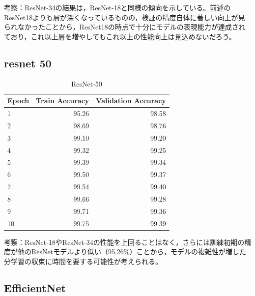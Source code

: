 \documentclass[a4paper,11pt,titlepage]{jsarticle}
\begin{document}
考察：ResNet-34の結果は，ResNet-18と同様の傾向を示している。前述のResNet18よりも層が深くなっているものの，検証の精度自体に著しい向上が見られなかったことから，ResNet18の時点で十分にモデルの表現能力が達成されており，これ以上層を増やしてもこれ以上の性能向上は見込めないだろう。

\subsection{resnet 50}

\begin{table}[H]
\centering
\caption{ResNet-50}
\label{tab:resnet50}
\begin{tabular}{lrr}
\hline
 Epoch &  Train Accuracy &  Validation Accuracy \\
\hline
     1 &           95.26 &                98.58 \\
     2 &           98.69 &                98.76 \\
     3 &           99.10 &                99.20 \\
     4 &           99.32 &                99.25 \\
     5 &           99.39 &                99.34 \\
     6 &           99.50 &                99.37 \\
     7 &           99.54 &                99.40 \\
     8 &           99.66 &                99.28 \\
     9 &           99.71 &                99.36 \\
    10 &           99.75 &                99.39 \\
\hline
\end{tabular}
\end{table}

考察：ResNet-18やResNet-34の性能を上回ることはなく，さらには訓練初期の精度が他のResNetモデルより低い（95.26\%）ことから，モデルの複雑性が増した分学習の収束に時間を要する可能性が考えられる。


\subsection{EfficientNet}
\end{document}
